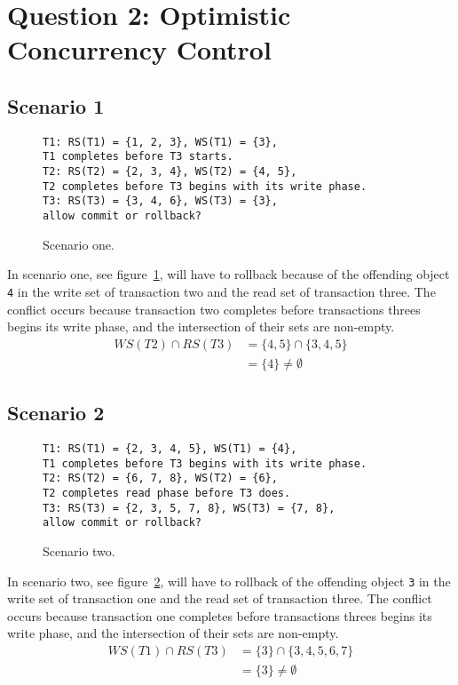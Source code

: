 \documentclass[12pt]{article}
\begin{document}
\section*{Question 2: Optimistic Concurrency Control}
\subsection*{Scenario 1}
\begin{figure}[h!]
\texttt{T1: RS(T1) = \{1, 2, 3\}, WS(T1) = \{3\},\\
T1 completes before T3 starts.\\
T2: RS(T2) = \{2, 3, 4\}, WS(T2) = \{4, 5\},\\
T2 completes before T3 begins with its write phase.\\
T3: RS(T3) = \{3, 4, 6\}, WS(T3) = \{3\},\\
allow commit or rollback?}
\caption{Scenario one.}
\label{sc1}
\end{figure}
In scenario one, see figure~\ref{sc1}, will have to rollback because of the offending object \texttt{4} in the write set of transaction two and the read set of transaction three. The conflict occurs because transaction two completes before transactions threes begins its write phase, and the intersection of their sets are non-empty.
\begin{align}
WS(T2) \cap RS(T3) &= \{4, 5\} \cap \{3, 4, 5\}\\
&= \{4\} \neq \emptyset
\end{align}
\subsection*{Scenario 2}
\begin{figure}[h!]
\texttt{T1: RS(T1) = \{2, 3, 4, 5\}, WS(T1) = \{4\},\\
T1 completes before T3 begins with its write phase.\\
T2: RS(T2) = \{6, 7, 8\}, WS(T2) = \{6\},\\
T2 completes read phase before T3 does.\\
T3: RS(T3) = \{2, 3, 5, 7, 8\}, WS(T3) = \{7, 8\},\\
allow commit or rollback?}
\caption{Scenario two.}
\label{sc2}
\end{figure}
In scenario two, see figure~\ref{sc2}, will have to rollback of the offending object \texttt{3} in the write set of transaction one and the read set of transaction three. The conflict occurs because transaction one completes before transactions threes begins its write phase, and the intersection of their sets are non-empty.
\begin{align}
WS(T1) \cap RS(T3) &= \{3\} \cap \{3, 4, 5, 6, 7\}\\
&= \{3\} \neq \emptyset
\end{align}
\end{document}
